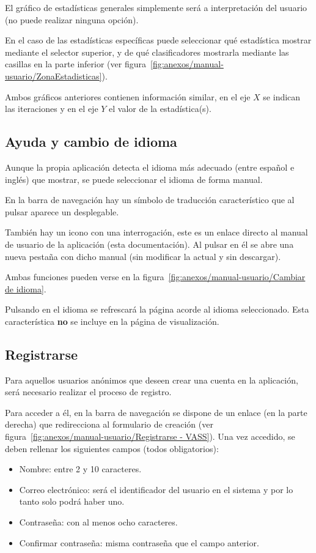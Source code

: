 El gráfico de estadísticas generales simplemente será a interpretación del
usuario (no puede realizar ninguna opción). 

En el caso de las estadísticas específicas puede seleccionar qué estadística
mostrar mediante el selector superior, y de qué clasificadores mostrarla
mediante las casillas en la parte inferior (ver
figura~\ref{fig:anexos/manual-usuario/ZonaEstadisticas}).

Ambos gráficos anteriores contienen información similar, en el eje $X$ se
indican las iteraciones y en el eje $Y$ el valor de la estadística(s).

\subsection{Ayuda y cambio de idioma}

Aunque la propia aplicación detecta el idioma más adecuado (entre español e
inglés) que mostrar, se puede seleccionar el idioma de forma manual.

En la barra de navegación hay un símbolo de traducción característico que al
pulsar aparece un desplegable.

También hay un icono con una interrogación, este es un enlace directo al manual
de usuario de la aplicación (esta documentación). Al pulsar en él se abre una
nueva pestaña con dicho manual (sin modificar la actual y sin descargar).

Ambas funciones pueden verse en la figura~\ref{fig:anexos/manual-usuario/Cambiar
de idioma}.


Pulsando en el idioma se refrescará la página acorde al idioma seleccionado.
Esta característica \textbf{no} se incluye en la página de visualización.

\subsection{Registrarse}

Para aquellos usuarios anónimos que deseen crear una cuenta en la aplicación,
será necesario realizar el proceso de registro.

Para acceder a él, en la barra de navegación se dispone de un enlace (en la
parte derecha) que redirecciona al formulario de creación (ver
figura~\ref{fig:anexos/manual-usuario/Registrarse - VASS}). Una vez accedido, se
deben rellenar los siguientes campos (todos obligatorios):
\begin{itemize}
    \item Nombre: entre 2 y 10 caracteres.
    \item Correo electrónico: será el identificador del usuario en el sistema y
    por lo tanto solo podrá haber uno.
    \item Contraseña: con al menos ocho caracteres.
    \item Confirmar contraseña: misma contraseña que el campo anterior.
\end{itemize}

